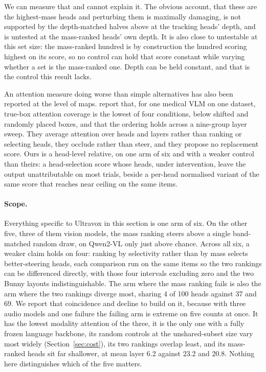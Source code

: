 \documentclass[11pt]{article}
\begin{document}
We can measure that and cannot explain it. The obvious account, that these are
the highest-mass heads and perturbing them is maximally damaging, is not
supported by the depth-matched halves above at the tracking heads' depth, and is
untested at the mass-ranked heads' own depth. It is also close to untestable at this
set size: the mass-ranked hundred is by construction the hundred scoring highest
on its score, so no control can hold that score constant while varying whether a
set is the mass-ranked one. Depth can be held constant, and that is the control
this result lacks.

An attention measure doing worse than simple alternatives has also been reported
at the level of maps.
\citet{sadanandan2026grounding} report that, for one medical VLM on one dataset, true-box attention coverage is the
lowest of four conditions, below shifted and randomly placed boxes, and that the
ordering holds across a nine-group layer sweep. They average attention over heads
and layers rather than ranking or selecting heads, they occlude rather than
steer, and they propose no replacement score. Ours is a head-level relative, on
one arm of six and with a weaker control than theirs: a head-selection score whose
heads, under intervention, leave the output unattributable on most trials, beside
a per-head normalised variant of the same score that reaches near ceiling on the
same items.

\paragraph{Scope.}
Everything specific to Ultravox in this section is one arm of six. On the other
five, three of them vision models, the mass ranking steers above a single
band-matched random draw, on Qwen2-VL only just above chance. Across all six, a
weaker claim holds on four: ranking by selectivity rather than by mass selects
better-steering heads, each comparison run on the same items so the two rankings
can be differenced directly, with those four intervals excluding zero and the two
Bunny layouts indistinguishable. The arm where the mass ranking fails is
also the arm where the two rankings diverge most, sharing 4 of 100 heads against
37 and 69. We report that coincidence and decline to build on it, because with
three audio models and one failure the failing arm is extreme on five counts at
once. It has the lowest modality attention of the three, it is the only one with
a fully frozen language backbone, its random controls at the unshared-subset size
vary most widely (Section~\ref{sec:cost}), its two rankings overlap least, and its mass-ranked
heads sit far shallower, at mean layer 6.2 against 23.2 and 20.8. Nothing here
distinguishes which of the five matters.
\end{document}
